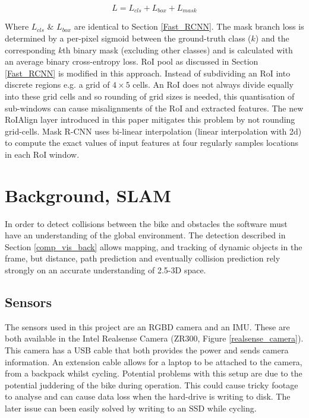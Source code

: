 \documentclass[a4paper,11pt,notitlepage]{article}
\begin{document}
\begin{equation}
\label{maskrcnnloss}
L = L_{cls} + L_{box} + L_{mask}
\end{equation}

Where $L_{cls}$ \& $L_{box}$ are identical to Section \ref{Fast_RCNN}. The mask branch loss is determined by a per-pixel sigmoid between the ground-truth class ($k$) and the corresponding $k$th binary mask (excluding other classes) and is calculated with an average binary cross-entropy loss.
\newline \newline
RoI pool as discussed in Section \ref{Fast_RCNN} is modified in this approach. Instead of subdividing an RoI into discrete regions e.g. a grid of $4 \times 5$ cells. An RoI does not always divide equally into these grid cells and so rounding of grid sizes is needed, this quantisation of sub-windows can cause misalignments of the RoI and extracted features. The new RoIAlign layer introduced in this paper mitigates this problem by not rounding grid-cells. Mask R-CNN uses bi-linear interpolation (linear interpolation with 2d) to compute the exact values of input features at four regularly samples locations in each RoI window.

\section{Background, SLAM}
In order to detect collisions between the bike and obstacles the software must have an understanding of the global environment. The detection described in Section \ref{comp_vis_back} allows mapping, and tracking of dynamic objects in the frame, but distance, path prediction and eventually collision prediction rely strongly on an accurate understanding of 2.5-3D space.

\subsection{Sensors}
The sensors used in this project are an RGBD camera and an IMU. These are both available in the Intel Realsense Camera (ZR300, Figure \ref{realsense_camera}). This camera has a USB cable that both provides the power and sends camera information. An extension cable allows for a laptop to be attached to the camera, from a backpack whilst cycling. Potential problems with this setup are due to the potential juddering of the bike during operation. This could cause tricky footage to analyse and can cause data loss when the hard-drive is writing to disk. The later issue can been easily solved by writing to an SSD while cycling.
\end{document}
